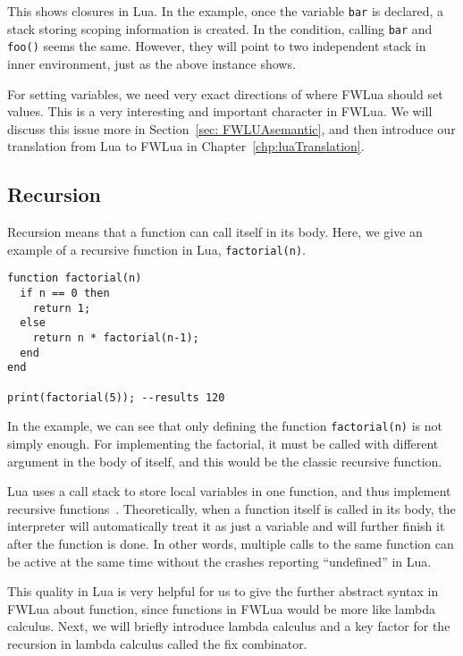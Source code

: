 This shows closures in Lua.
In the example, once the variable {\tt bar} is declared, a stack storing scoping information is created.
In the condition, calling {\tt bar} and {\tt foo()} seems the same. However, they will point to two independent stack in inner environment, just as the above instance shows.

For setting variables, we need very exact directions of where FWLua should set values. This is a very interesting and important character in FWLua. We will discuss this issue more in Section~\ref{sec: FWLUAsemantic}, and then introduce our translation from Lua to FWLua in Chapter~\ref{chp:luaTranslation}.

\subsection{Recursion}\label{sec:recursions}

Recursion means that a function can call itself in its body.
Here, we give an example of a recursive function in Lua, {\tt factorial(n)}.

\begin{verbatim}
function factorial(n)
  if n == 0 then
    return 1;
  else
    return n * factorial(n-1);
  end
end

print(factorial(5)); --results 120
\end{verbatim}

In the example, we can see that only defining the function {\tt factorial(n)} is not simply enough. For implementing the factorial, it must be called with different argument in the body of itself, and this would be the classic recursive function.

Lua uses a call stack to store local variables in one function, and thus implement recursive functions~\cite{begLua}. Theoretically, when a function itself is called in its body, the interpreter will automatically treat it as just a variable and will further finish it after the function is done. In other words, multiple calls to the same function can be active at the same time without the crashes reporting ``undefined'' in Lua.

This quality in Lua is very helpful for us to give the further abstract syntax in FWLua about function, since functions in FWLua would be more like lambda calculus. Next, we will briefly introduce lambda calculus and a key factor for the recursion in lambda calculus called the fix combinator.

